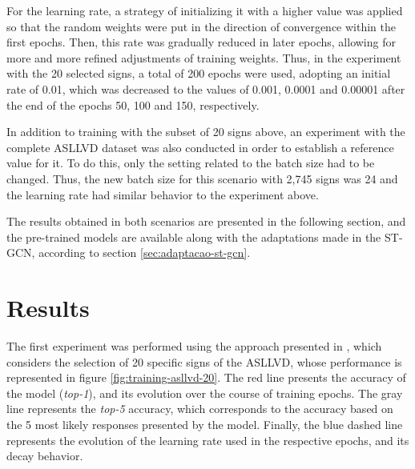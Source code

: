 For the learning rate, a strategy of initializing it with a higher value was applied so that the random weights were put in the direction of convergence within the first epochs. Then, this rate was gradually reduced in later epochs, allowing for more and more refined adjustments of training weights. Thus, in the experiment with the 20 selected signs, a total of 200 epochs were used, adopting an initial rate of 0.01, which was decreased to the values of 0.001, 0.0001 and 0.00001 after the end of the epochs 50, 100 and 150, respectively.

In addition to training with the subset of 20 signs above, an experiment with the complete ASLLVD dataset was also conducted in order to establish a reference value for it. To do this, only the setting related to the batch size had to be changed. Thus, the new batch size for this scenario with 2,745 signs was 24 and the learning rate had similar behavior to the experiment above.

The results obtained in both scenarios are presented in the following section, and the pre-trained models are available along with the adaptations made in the ST-GCN, according to section \ref{sec:adaptacao-st-gcn}.


\section{Results} 
\label{sec:resultados}

The first experiment was performed using the approach presented in \cite{lim-2016}, which considers the selection of 20 specific signs of the ASLLVD, whose performance is represented in figure \ref{fig:training-asllvd-20}. The red line presents the accuracy of the model (\textit{top-1}), and its evolution over the course of training epochs. The gray line represents the \textit{top-5} accuracy, which corresponds to the accuracy based on the 5 most likely responses presented by the model. Finally, the blue dashed line represents the evolution of the learning rate used in the respective epochs, and its decay behavior.


